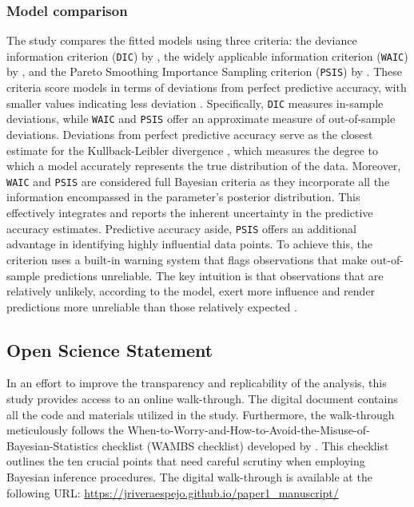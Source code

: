 \documentclass[
  authoryear,
  preprint,
  1p]{elsarticle}
\begin{document}
\subsubsection{Model comparison}\label{sec-M-SM-MC}

The study compares the fitted models using three criteria: the deviance
information criterion (\texttt{DIC}) by
\citet{Spiegelhalter_et_al_2002}, the widely applicable information
criterion (\texttt{WAIC}) by \citet{Watanabe_2013}, and the Pareto
Smoothing Importance Sampling criterion (\texttt{PSIS}) by
\citet{Vehtari_et_al_2017}. These criteria score models in terms of
deviations from perfect predictive accuracy, with smaller values
indicating less deviation \citep{McElreath_2020}. Specifically,
\texttt{DIC} measures in-sample deviations, while \texttt{WAIC} and
\texttt{PSIS} offer an approximate measure of out-of-sample deviations.
Deviations from perfect predictive accuracy serve as the closest
estimate for the Kullback-Leibler divergence
\citep{Kullback_et_al_1951}, which measures the degree to which a model
accurately represents the true distribution of the data. Moreover,
\texttt{WAIC} and \texttt{PSIS} are considered full Bayesian criteria as
they incorporate all the information encompassed in the parameter's
posterior distribution. This effectively integrates and reports the
inherent uncertainty in the predictive accuracy estimates. Predictive
accuracy aside, \texttt{PSIS} offers an additional advantage in
identifying highly influential data points. To achieve this, the
criterion uses a built-in warning system that flags observations that
make out-of-sample predictions unreliable. The key intuition is that
observations that are relatively unlikely, according to the model, exert
more influence and render predictions more unreliable than those
relatively expected \citep{McElreath_2020}.

\subsection{Open Science Statement}\label{sec-M-SM-OS}

In an effort to improve the transparency and replicability of the
analysis, this study provides access to an online walk-through. The
digital document contains all the code and materials utilized in the
study. Furthermore, the walk-through meticulously follows the
When-to-Worry-and-How-to-Avoid-the-Misuse-of-Bayesian-Statistics
checklist (WAMBS checklist) developed by \citet{Depaoli_et_al_2017}.
This checklist outlines the ten crucial points that need careful
scrutiny when employing Bayesian inference procedures. The digital
walk-through is available at the following {URL}:
\url{https://jriveraespejo.github.io/paper1_manuscript/}
\end{document}
